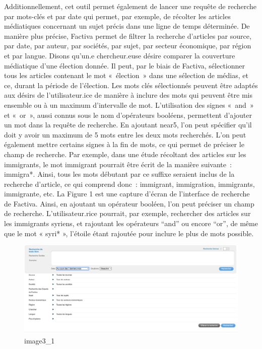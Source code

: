 \documentclass[
  letterpaper,
]{scrbook}
\begin{document}
Additionnellement, cet outil permet également de lancer une requête de
recherche par mots-clés et par date qui permet, par exemple, de récolter
les articles médiatiques concernant un sujet précis dans une ligne de
temps déterminée. De manière plus précise, Factiva permet de filtrer la
recherche d'articles par source, par date, par auteur, par sociétés, par
sujet, par secteur économique, par région et par langue. Disons qu'un.e
chercheur.euse désire comparer la couverture médiatique d'une élection
donnée. Il peut, par le biais de Factiva, sélectionner tous les articles
contenant le mot «~élection~» dans une sélection de médias, et ce,
durant la période de l'élection. Les mots clés sélectionnés peuvent être
adaptés aux désirs de l'utilisateur.ice de manière à inclure des mots
qui peuvent être mis ensemble ou à un maximum d'intervalle de mot.
L'utilisation des signes «~and~» et «~or~», aussi connus sous le nom
d'opérateurs booléens, permettent d'ajouter un mot dans la requête de
recherche. En ajoutant near5, l'on peut spécifier qu'il doit y avoir un
maximum de 5 mots entre les deux mots recherchés. L'on peut également
mettre certains signes à la fin de mots, ce qui permet de préciser le
champ de recherche. Par exemple, dans une étude récoltant des articles
sur les immigrants, le mot immigrant pourrait être écrit de la manière
suivante~: immigra*. Ainsi, tous les mots débutant par ce suffixe
seraient inclus de la recherche d'article, ce qui comprend donc~:
immigrant, immigration, immigrants, immigrante, etc. La Figure 1 est une
capture d'écran de l'interface de recherche de Factiva. Ainsi, en
ajoutant un opérateur booléen, l'on peut préciser un champ de recherche.
L'utilisateur.rice pourrait, par exemple, rechercher des articles sur
les immigrants syriens, et rajoutant les opérateurs ``and'' ou encore
``or'', de même que le mot « syri* », l'étoile étant rajoutée pour
inclure le plus de mots possible.

\begin{figure}

{\centering \includegraphics{images/chapitre3_factiva.png}

}

\caption{image3\_1}

\end{figure}
\end{document}

